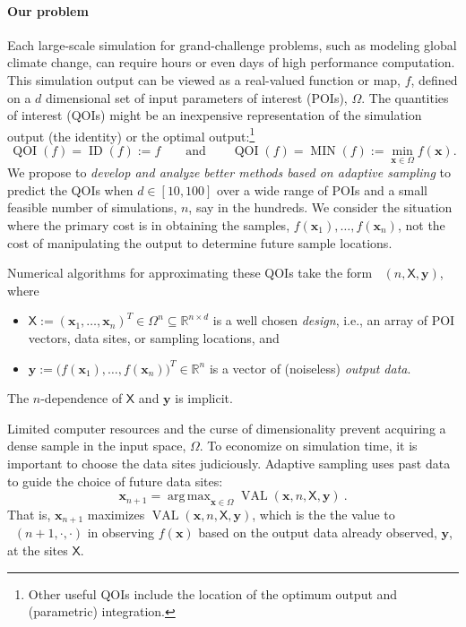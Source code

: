 \documentclass[11pt]{NSFamsart}
\DeclareMathOperator*{\argmax}{arg\,max}
\DeclareMathOperator{\QOI}{QOI} %
\DeclareMathOperator{\APP}{\widehat{\QOI}}
\DeclareMathOperator{\VAL}{VAL}
\DeclareMathOperator{\MIN}{MIN}
\DeclareMathOperator{\ID}{ID}
\newcommand{\reals}{{\mathbb{R}}}
\newcommand{\mX}{\mathsf{X}}
\newcommand{\bx}{{\boldsymbol{x}}}
\newcommand{\by}{{\boldsymbol{y}}}
\begin{document}
\paragraph*{Our problem}
Each large-scale simulation for grand-challenge problems, such as modeling global climate change, can require hours or even days of high performance computation.  This simulation output can be viewed as a real-valued function or map, $f$, defined on a $d$ dimensional set of input parameters of interest (POIs), $\Omega$.  The quantities of interest (QOIs) might be 
an inexpensive representation of the simulation output (the identity) or the optimal output:\footnote{Other useful QOIs include the location of the optimum output and (parametric) integration.}  
\begin{equation} \label{eq:ourQOIs}
    \QOI(f) = \ID(f) := f \qquad \text{and} \qquad \QOI(f) = \MIN(f) := \min_{\bx \in \Omega} f(\bx).
\end{equation}
We propose to \emph{develop and analyze better methods based on adaptive sampling} to predict the QOIs when $d \in [10, 100]$ over a wide range of POIs and a small feasible number of simulations, $n$, say in the hundreds.  We consider the situation where the primary cost is in obtaining the samples, $f(\bx_1), \ldots, f(\bx_n)$, not the cost of manipulating the output to determine future sample locations. 

Numerical algorithms for approximating these QOIs take the form $\APP(n,\mX,\by)$, where 
\begin{itemize}
    \item $\mX := (\bx_1, \ldots, \bx_n)^T \in \Omega^{n} \subseteq \reals^{n \times d}$ is a well chosen \emph{design}, i.e., an array of POI vectors, data sites, or sampling locations, and
    
    \item $\by := \bigl(f(\bx_1), \ldots, f(\bx_n) \bigr)^T \in \reals^n$ is a vector of (noiseless) \emph{output data}.
\end{itemize}   
The $n$-dependence of $\mX$ and $\by$ is implicit.  

Limited computer resources and the curse of dimensionality prevent acquiring a dense sample in the input space, $\Omega$. To economize on simulation time, it is important to choose the data sites judiciously. Adaptive sampling uses past data to guide the choice of future data sites:   
\begin{equation} \label{eq:nextsample}
    \bx_{n+1} = \argmax_{\bx \in \Omega} \VAL(\bx,n,\mX, \by)~.
\end{equation}
That is, $\bx_{n+1}$ maximizes $\VAL(\bx,n,\mX, \by)$, which is the the value to $\APP(n+1,\cdot,\cdot)$ in observing $f(\bx)$ based on the output data already observed, $\by$, at the sites $\mX$.  
\end{document}
